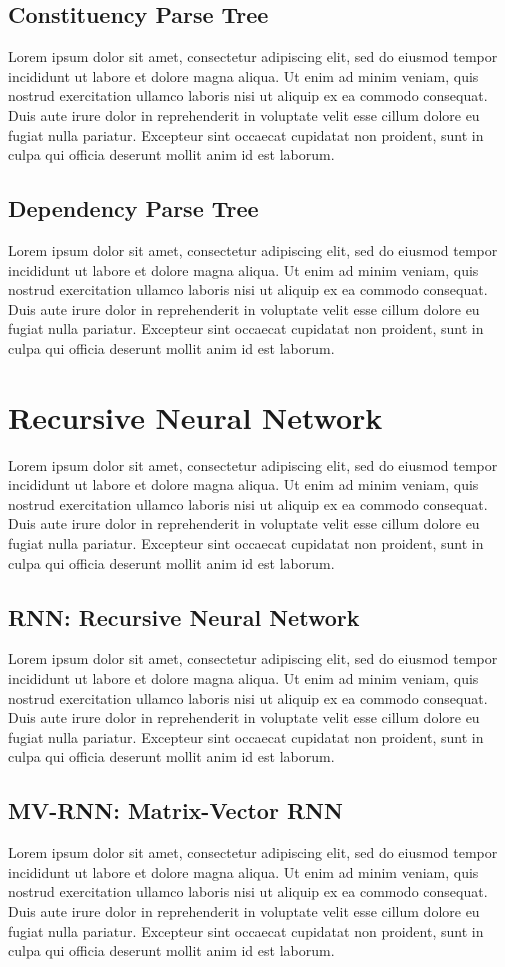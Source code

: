 \subsection{Constituency Parse Tree}
Lorem ipsum dolor sit amet, consectetur adipiscing elit, sed do eiusmod tempor incididunt ut labore et dolore magna aliqua. Ut enim ad minim veniam, quis nostrud exercitation ullamco laboris nisi ut aliquip ex ea commodo consequat. Duis aute irure dolor in reprehenderit in voluptate velit esse cillum dolore eu fugiat nulla pariatur. Excepteur sint occaecat cupidatat non proident, sunt in culpa qui officia deserunt mollit anim id est laborum.
\subsection{Dependency Parse Tree}
Lorem ipsum dolor sit amet, consectetur adipiscing elit, sed do eiusmod tempor incididunt ut labore et dolore magna aliqua. Ut enim ad minim veniam, quis nostrud exercitation ullamco laboris nisi ut aliquip ex ea commodo consequat. Duis aute irure dolor in reprehenderit in voluptate velit esse cillum dolore eu fugiat nulla pariatur. Excepteur sint occaecat cupidatat non proident, sunt in culpa qui officia deserunt mollit anim id est laborum.
\section{Recursive Neural Network}
Lorem ipsum dolor sit amet, consectetur adipiscing elit, sed do eiusmod tempor incididunt ut labore et dolore magna aliqua. Ut enim ad minim veniam, quis nostrud exercitation ullamco laboris nisi ut aliquip ex ea commodo consequat. Duis aute irure dolor in reprehenderit in voluptate velit esse cillum dolore eu fugiat nulla pariatur. Excepteur sint occaecat cupidatat non proident, sunt in culpa qui officia deserunt mollit anim id est laborum.
\subsection{RNN: Recursive Neural Network}
Lorem ipsum dolor sit amet, consectetur adipiscing elit, sed do eiusmod tempor incididunt ut labore et dolore magna aliqua. Ut enim ad minim veniam, quis nostrud exercitation ullamco laboris nisi ut aliquip ex ea commodo consequat. Duis aute irure dolor in reprehenderit in voluptate velit esse cillum dolore eu fugiat nulla pariatur. Excepteur sint occaecat cupidatat non proident, sunt in culpa qui officia deserunt mollit anim id est laborum.
\subsection{MV-RNN: Matrix-Vector RNN}
Lorem ipsum dolor sit amet, consectetur adipiscing elit, sed do eiusmod tempor incididunt ut labore et dolore magna aliqua. Ut enim ad minim veniam, quis nostrud exercitation ullamco laboris nisi ut aliquip ex ea commodo consequat. Duis aute irure dolor in reprehenderit in voluptate velit esse cillum dolore eu fugiat nulla pariatur. Excepteur sint occaecat cupidatat non proident, sunt in culpa qui officia deserunt mollit anim id est laborum.
